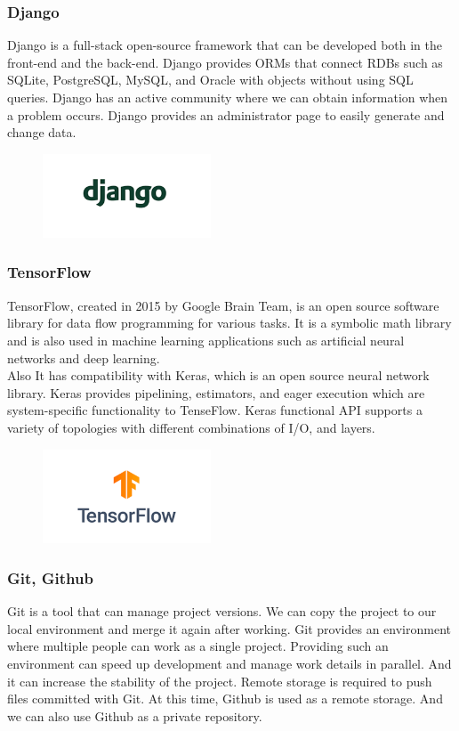 \documentclass[conference]{IEEEtran}
\begin{document}
\subsubsection{Django}
Django is a full-stack open-source framework that can be developed both in the front-end and the back-end. Django provides ORMs that connect RDBs such as SQLite, PostgreSQL, MySQL, and Oracle with objects without using SQL queries.  Django has an active community where we can obtain information when a problem occurs. Django provides an administrator page to easily generate and change data. \\

\begin{figure}[h!]
\centering
\includegraphics[width=5cm]{imagefolder/django.png}
\caption{}
\label{fig:map}
\end{figure}

\subsubsection{TensorFlow}
TensorFlow, created in 2015 by Google Brain Team, is an open source software library for data flow programming for various tasks. It is a symbolic math library and is also used in machine learning applications such as artificial neural networks and deep learning. \\
Also It has compatibility with Keras, which is an open source neural network library. Keras provides pipelining, estimators, and eager execution which are system-specific functionality to TenseFlow. Keras functional API supports a variety of topologies with different combinations of I/O, and layers. \\
\begin{figure}[h!]
\centering
\includegraphics[width=5cm]{imagefolder/tensor.png}
\caption{}
\label{fig:map}
\end{figure}

\subsubsection{Git, Github}
Git is a tool that can manage project versions. We can copy the project to our local environment and merge it again after working. Git provides an environment where multiple people can work as a single project. Providing such an environment can speed up development and manage work details in parallel. And it can increase the stability of the project. Remote storage is required to push files committed with Git. At this time, Github is used as a remote storage. And we can also use Github as a private repository.\\
\end{document}
